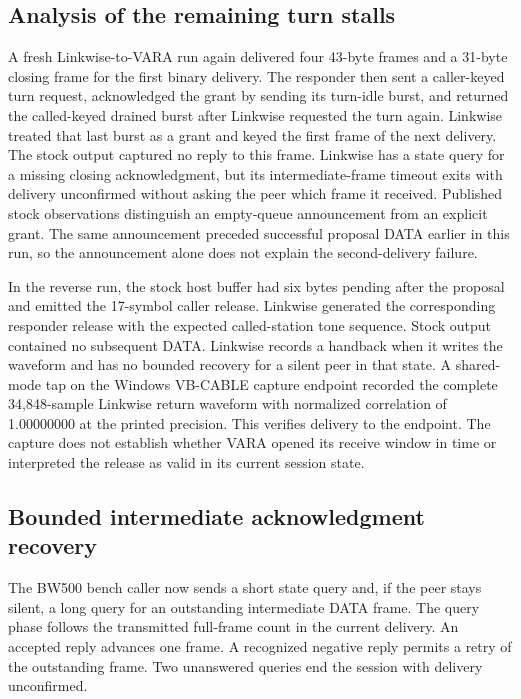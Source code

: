 \documentclass[11pt,a4paper]{article}
\begin{document}
\subsection{Analysis of the remaining turn stalls}

A fresh Linkwise-to-VARA run again delivered four 43-byte frames
and a 31-byte closing frame for the first binary delivery. The
responder then sent a caller-keyed turn request, acknowledged the
grant by sending its turn-idle burst, and returned the called-keyed
drained burst after Linkwise requested the turn again. Linkwise
treated that last burst as a grant and keyed the first frame of the
next delivery. The stock output captured no reply to this frame.
Linkwise has a state query for a missing closing acknowledgment,
but its intermediate-frame timeout exits with delivery unconfirmed
without asking the peer which frame it received.
Published stock observations distinguish an empty-queue
announcement from an explicit grant. The same announcement
preceded successful proposal DATA earlier in this run, so the
announcement alone does not explain the second-delivery failure.

In the reverse run, the stock host buffer had six bytes pending
after the proposal and emitted the 17-symbol caller release.
Linkwise generated the corresponding responder release with the
expected called-station tone sequence. Stock output contained no
subsequent DATA. Linkwise records a handback when it writes the
waveform and has no bounded recovery for a silent peer in that
state. A shared-mode tap on the Windows VB-CABLE capture endpoint
recorded the complete 34,848-sample Linkwise return waveform with
normalized correlation of 1.00000000 at the printed precision.
This verifies delivery to the endpoint. The capture does not
establish whether VARA opened its receive window in time or
interpreted the release as valid in its current session state.

\subsection{Bounded intermediate acknowledgment recovery}

The BW500 bench caller now sends a short state query and, if the
peer stays silent, a long query for an outstanding intermediate
DATA frame. The query phase follows the transmitted full-frame
count in the current delivery. An accepted reply advances one
frame. A recognized negative reply permits a retry of the
outstanding frame. Two unanswered queries end the session with
delivery unconfirmed.
\end{document}
